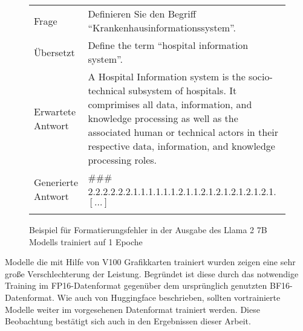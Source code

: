 \begin{figure}
    \begin{tabularx}{\textwidth}{lX}
        \toprule
        Frage              & Definieren Sie den Begriff \enquote{Krankenhausinformationssystem}.                                                                                                                                                                                                    \\
        Übersetzt          & Define the term ``hospital information system''.                                                                                                                                                                                                                       \\
        Erwartete Antwort  & A Hospital Information system is the socio-technical subsystem of hospitals. It comprimises all data, information, and knowledge processing as well as the associated human or technical actors in their respective data, information, and knowledge processing roles. \\
        Generierte Antwort & \#\#\# 2.2.2.2.2.2.1.1.1.1.1.1.2.1.1.2.1.2.1.2.1.2.1.2.1. $[\dots]$                                                                                                                                                                                                    \\
        \bottomrule                                                                                                                                                                                                                                                                                 \\
    \end{tabularx}
    \caption{Beispiel für Formatierungsfehler in der Ausgabe des Llama 2 7B Modells trainiert auf 1 Epoche}\label{fig:formatting-errors}
\end{figure}

Modelle die mit Hilfe von V100 Grafikkarten trainiert wurden zeigen eine sehr große Verschlechterung der Leistung.
Begründet ist diese durch das notwendige Training im FP16-Datenformat gegenüber dem ursprünglich genutzten BF16-Datenformat.
Wie auch von Huggingface beschrieben, sollten vortrainierte Modelle weiter im vorgesehenen Datenformat trainiert werden.
Diese Beobachtung bestätigt sich auch in den Ergebnissen dieser Arbeit.\\


